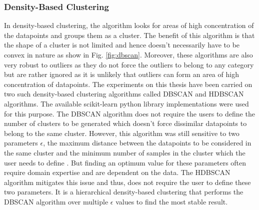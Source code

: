 \subsubsection{Density-Based Clustering}
 In density-based clustering, the algorithm looks for areas of high concentration of the datapoints and groups them as a cluster. The benefit of this algorithm is that the shape of a cluster is not limited and hence doesn't necessarily have to be convex in nature as show in Fig. \ref{fig:dbscan}.
Moreover, these algorithms are also very robust to outliers as they do not force the outliers to belong to any category but are rather ignored as it is unlikely that outliers can form an area of high concentration of datapoints. The experiments on this thesis have been carried on two such density-based clustering algorithms called \ac{DBSCAN}\cite{dbscan} and \ac{HDBSCAN} algorithms\cite{hdbscan}. The available scikit-learn python library implementations were used for this purpose\cite{scikit-learn}. The \ac{DBSCAN}\cite{dbscan} algorithm  does not require the users to define the number of clusters to be generated which doesn't force dissimilar datapoints to belong to the same cluster. However, this algorithm was still sensitive to two parameters $\epsilon$, the maximum distance between the datapoints to be considered in the same cluster and the minimum number of samples in the cluster which the user needs to define \cite{scikit-learn}. But finding an optimum value for these parameters often require domain expertise and are dependent on the data. The \ac{HDBSCAN}\cite{hdbscan} algorithm mitigates this issue and thus, does not require the user to define these two parameters. It is a hierarchical density-based clustering that performs the \ac{DBSCAN} algorithm over multiple $\epsilon$ values to find the most stable result. 


